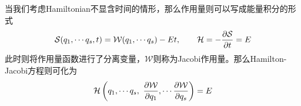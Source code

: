 当我们考虑Hamiltonian不显含时间的情形，那么作用量则可以写成能量积分的形式
\begin{equation}
    \mathcal{S} (q_1,\cdots q_s,t) = \mathcal{W}(q_1,\cdots q_s)-Et,\qquad \mathcal{H} = - \frac{\partial\mathcal{S}}{\partial t} = E
\end{equation}
此时则将作用量函数进行了分离变量，$\mathcal{W}$则称为Jacobi作用量。那么Hamilton-Jacobi方程则可化为
\begin{equation}
    \mathcal{H}\left(q_1,\cdots q_s,~\frac{\partial\mathcal{{W}}}{\partial q_1},\cdots \frac{\partial\mathcal{{W}}}{\partial q_s} \right) = E
\end{equation}

